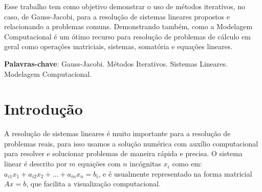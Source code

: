 \documentclass[
	12pt,				%
	openright,			%
	twoside,			%
	a4paper,			%
	english,			%
	french,				%
	spanish,			%
	brazil				%
	]{abntex2_new}
\begin{document}

\frenchspacing 


\imprimircapa


\imprimirfolhaderosto*


\begin{fichacatalografica}
	\sffamily
	\vspace*{\fill}					%
	\begin{center}					%
	\end{center}
\end{fichacatalografica}


\clearpage

\setlength{\absparsep}{18pt}
\begin{resumo}
 Esse trabalho tem como objetivo demonstrar o uso de métodos iterativos, no caso, de Gauss-Jacobi, para
 a resolução de sistemas lineares propostos e relacionando a problemas comuns. Demonstrando também, como a Modelagem Computacional é um ótimo recurso 
 para resolução de  problemas de cálculo em geral como operações matriciais, sistemas,
 somatória e equações lineares.

 \textbf{Palavras-chave}: Gauss-Jacobi. Métodos Iterativos. Sistemas Lineares. Modelagem Computacional.
\end{resumo}

\tableofcontents*


\textual


\chapter*[Introdução]{Introdução}
A resolução de sistemas lineares é muito importante para a resolução de problemas
reais, para isso usamos a solução numérica com auxílio computacional para resolver
e solucionar problemas de maneira rápida e precisa. O sistema linear é descrito por 
$m$ equações com $n$ incógnitas $x_i$ como em: $a_{i1} x_1 + a_{i2} x_2 + ... + a_{in} x_n = b_i$, 
e é usualmente representado na forma matricial $Ax = b$, que facilita a visualização
computacional.
\end{document}
